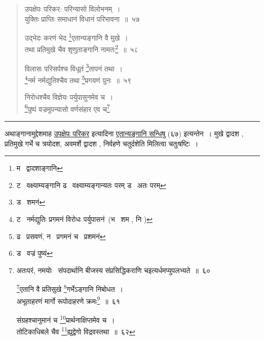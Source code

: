 \documentclass[11pt, openany]{book}
\begin{document}
\begin{quote}
{\na उपक्षेपः परिकर: परिन्यासो विलोभनम्~।\\
युक्तिः प्राप्तिः समाधानं विधानं परिभावना~॥~५७

उद्भेदः करणं भेद \renewcommand{\thefootnote}{1}\footnote{म \textendash\ द्वादशाङ्गानि}एतान्यङ्गानि वै मुखे~।\\
तथा प्रतिमुखे चैव शृणुताङ्गानि नामतः\renewcommand{\thefootnote}{2}\footnote{ट \textendash\ वक्ष्याम्यङ्गानि ढ \textendash\ वक्ष्याम्यङ्गान्यतः परम् ड \textendash\ अतः परम्}~॥~५८
 
विलासः परिसर्पश्च विधूतं \renewcommand{\thefootnote}{3}\footnote{ड \textendash\ शमनं}तापनं तथा~।\\
\renewcommand{\thefootnote}{4}\footnote{ट \textendash\ नर्मद्युतिः प्रगमनं विरोधः पर्युपासनं\ (भ \textendash\ शम , नि )}नर्म नर्मद्युतिश्चैव तथा \renewcommand{\thefootnote}{5}\footnote{ढ \textendash\ प्रसवणं, न \textendash\ प्रगमनं च \textendash\ प्रशमनं}प्रगयणं पुनः~॥~५९

निरोधश्चैव विज्ञेयः पर्युपासुनमेव च~।\\
\renewcommand{\thefootnote}{6}\footnote{ड \textendash\ वज्रं पुष्यं}पुष्पं वज्रमुपन्यासो वर्णसंहार एव च\renewcommand{\thefootnote}{7}\footnote{अतःपरं, नमयोः \textendash\ संपदार्थानि बीजस्य संप्रसिद्धिकराणि च{\qt इत्यर्धमप्युपलभ्यते}~॥~६०

\renewcommand{\thefootnote}{8}\footnote{भ \textendash\ एतान्येव}एतानि वै प्रतिसुखे \renewcommand{\thefootnote}{9}\footnote{भ \textendash\ गर्भाङ्गानि, य \textendash\ गर्भे चैव}गर्भेऽङ्गानि निबोधत~।\\
अभूताहरणं मार्गो रूपोदाहरणे क्रमः\renewcommand{\thefootnote}{10}\footnote{भ \textendash\ रूपमाहरणं क्रमः ढ \textendash\ हरणक्रमाः}~॥~६१

संग्रहश्चानुमानं च \renewcommand{\thefootnote}{11}\footnote{च \textendash\ प्रार्थनाक्षिप्तिरेव भ \textendash\ तोटकाधिबले तथा~। उद्वेगसंभ्रमाक्षेपा गर्भाङ्गानीति योजयेत्}प्रार्थनाक्षिप्तमेव च~।\\
तोटिकाधिबले चैव \renewcommand{\thefootnote}{12}\footnote{ट \textendash\ चोद्भेदो विभ्रमः}ह्युद्वेगो विद्रवस्तथा~॥~६२}}
\end{quote}

\hrule

\vspace{2mm}
अथाङ्गानामुद्देशमाह \underline{उपक्षेपः परिकर} इत्यादिना \underline{एतान्यङ्गानि सन्धिषु} (६७) इत्यन्तेन~। मुखे द्वादश , प्रतिमुखे गर्भे च त्रयोदश, अवमर्शे द्वादश , निर्वहणे चतुर्दशेति मिलित्वा चतुःषष्टिः~।\\
\end{document}
